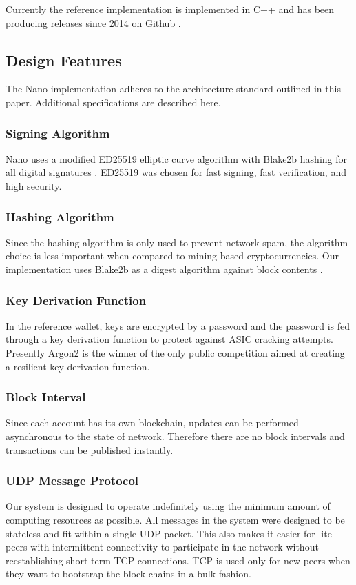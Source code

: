 Currently the reference implementation is implemented in C++ and has been producing releases since 2014 on Github \cite{LeMahieu_github}.

\subsection{Design Features}
The Nano implementation adheres to the architecture standard outlined in this paper. Additional specifications are described here.

\subsubsection{Signing Algorithm}
Nano uses a modified ED25519 elliptic curve algorithm with Blake2b hashing for all digital signatures \cite{Bernstein_ED25519}. ED25519 was chosen for fast signing, fast verification, and high security.

\subsubsection{Hashing Algorithm}
Since the hashing algorithm is only used to prevent network spam, the algorithm choice is less important when compared to mining-based cryptocurrencies. Our implementation uses Blake2b as a digest algorithm against block contents \cite{Aumasson_blake2}.

\subsubsection{Key Derivation Function}
In the reference wallet, keys are encrypted by a password and the password is fed through a key derivation function to protect against ASIC cracking attempts. Presently Argon2 \cite{Biryukov_argon2} is the winner of the only public competition aimed at creating a resilient key derivation function.

\subsubsection{Block Interval}
Since each account has its own blockchain, updates can be performed asynchronous to the state of network. Therefore there are no block intervals and transactions can be published instantly.

\subsubsection{UDP Message Protocol}
Our system is designed to operate indefinitely using the minimum amount of computing resources as possible. All messages in the system were designed to be stateless and fit within a single UDP packet. This also makes it easier for lite peers with intermittent connectivity to participate in the network without reestablishing short-term TCP connections. TCP is used only for new peers when they want to bootstrap the block chains in a bulk fashion.


